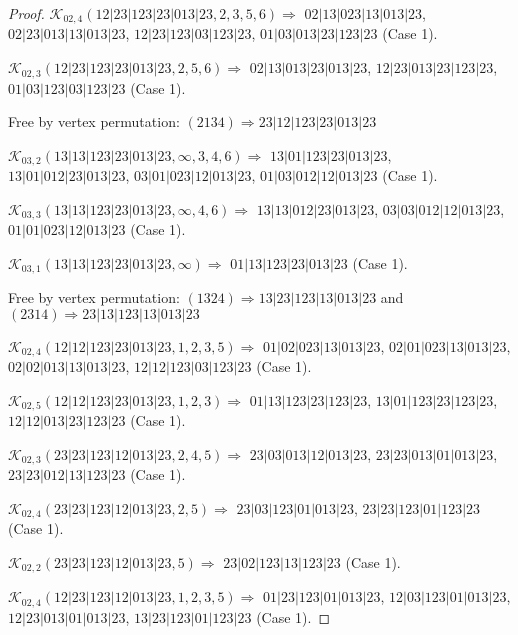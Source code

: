 \documentclass[12pt]{article}
\theoremstyle{plain}
\theoremstyle{definition}
\theoremstyle{remark}
\newcommand{\fancy}[1]{\mathcal{#1}}
\def\K{\fancy{K}}
\begin{document}
\begin{proof}
	
	
	\bigskip
	
	$\K_{02,4}(12|23|123|23|013|23,2, 3, 5, 6)\Rightarrow $ $02|13|023|13|013|23$, $02|23|013|13|013|23$, $12|23|123|03|123|23$, $01|03|013|23|123|23$ (Case 1).
	
	$\K_{02,3}(12|23|123|23|013|23,2, 5, 6)\Rightarrow $ $02|13|013|23|013|23$, $12|23|013|23|123|23$, $01|03|123|03|123|23$ (Case 1).
	
	
	
	Free by vertex permutation: $(2 1 3 4)\Rightarrow 23|12|123|23|013|23$
	
	
	
	\bigskip
	
	$\K_{03,2}(13|13|123|23|013|23,\infty,3, 4, 6)\Rightarrow $ $13|01|123|23|013|23$, $13|01|012|23|013|23$, $03|01|023|12|013|23$, $01|03|012|12|013|23$ (Case 1).
	
	$\K_{03,3}(13|13|123|23|013|23,\infty,4, 6)\Rightarrow $ $13|13|012|23|013|23$, $03|03|012|12|013|23$, $01|01|023|12|013|23$ (Case 1).
	
	$\K_{03,1}(13|13|123|23|013|23,\infty)\Rightarrow $ $01|13|123|23|013|23$ (Case 1).
	
	
	
	Free by vertex permutation: $(1 3 2 4)\Rightarrow 13|23|123|13|013|23$ and $(2 3 1 4)\Rightarrow 23|13|123|13|013|23$
	
	
	
	\bigskip
	
	$\K_{02,4}(12|12|123|23|013|23,1, 2, 3, 5)\Rightarrow $ $01|02|023|13|013|23$, $02|01|023|13|013|23$, $02|02|013|13|013|23$, $12|12|123|03|123|23$ (Case 1).
	
	$\K_{02,5}(12|12|123|23|013|23,1, 2, 3)\Rightarrow $ $01|13|123|23|123|23$, $13|01|123|23|123|23$, $12|12|013|23|123|23$ (Case 1).
	
	
	\bigskip
	
	$\K_{02,3}(23|23|123|12|013|23,2, 4, 5)\Rightarrow $ $23|03|013|12|013|23$, $23|23|013|01|013|23$, $23|23|012|13|123|23$ (Case 1).
	
	$\K_{02,4}(23|23|123|12|013|23,2, 5)\Rightarrow $ $23|03|123|01|013|23$, $23|23|123|01|123|23$ (Case 1).
	
	$\K_{02,2}(23|23|123|12|013|23,5)\Rightarrow $ $23|02|123|13|123|23$ (Case 1).
	
	
	\bigskip
	
	$\K_{02,4}(12|23|123|12|013|23,1, 2, 3, 5)\Rightarrow $ $01|23|123|01|013|23$, $12|03|123|01|013|23$, $12|23|013|01|013|23$, $13|23|123|01|123|23$ (Case 1).
	

\end{proof}
\end{document}
